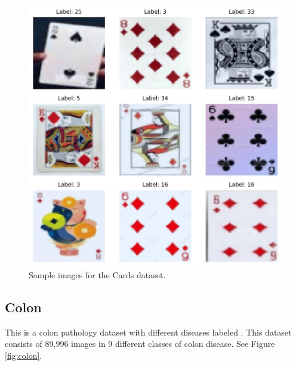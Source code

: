 \documentclass[letterpaper]{article} %
\theoremstyle{plain}
\theoremstyle{definition}
\theoremstyle{remark}
\begin{document}
\begin{figure}[htbp]
    \centering
    \includegraphics[width=\columnwidth]{../../images/cards_1_sample.jpg}
    \caption{Sample images for the Cards dataset.}
    \label{fig:cards}
\end{figure}


\subsection{Colon} This is a colon pathology dataset with different diseases labeled \citep{yang2023medmnist}. This dataset consists of 89,996 images in 9 different classes of colon disease. See Figure \ref{fig:colon}.
\end{document}

